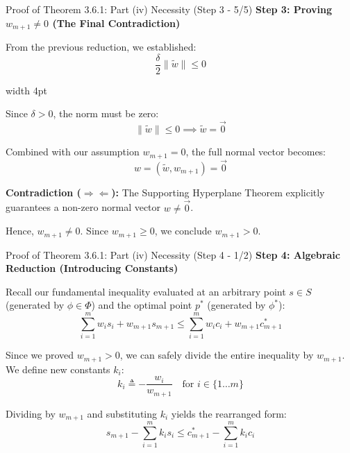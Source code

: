 \documentclass[10pt, aspectratio=169, xcolor=dvipsnames]{beamer}
\newcommand{\lead}[1]{{\color{UniBlue}\bfseries #1}}
\begin{document}
\begin{frame}{Proof of Theorem 3.6.1: Part (iv) Necessity (Step 3 - 5/5)}
    \lead{Step 3: Proving $w_{m+1} \neq 0$ (The Final Contradiction)}\\
    \vspace{0.3cm}
    
    From the previous reduction, we established:
    \[ \frac{\delta}{2} \|\tilde{w}\| \le 0 \]
    
    \vspace{0.3cm}
    \noindent
    {\color{Teal}\vrule width 4pt}%
    \hspace{10pt}%
    \begin{minipage}{\dimexpr\textwidth-14pt\relax}
        \color{Slate}
        Since $\delta > 0$, the norm must be zero:
        \[ \|\tilde{w}\| \le 0 \implies \tilde{w} = \vec{0} \]
        
        \vspace{0.1cm}
        Combined with our assumption $w_{m+1} = 0$, the full normal vector becomes:
        \[ w = (\tilde{w}, w_{m+1}) = \vec{0} \]
        
        \vspace{0.2cm}
        \textbf{Contradiction ($\Rightarrow\Leftarrow$):} The Supporting Hyperplane Theorem explicitly guarantees a non-zero normal vector $w \neq \vec{0}$.
        
        \vspace{0.3cm}
        Hence, $w_{m+1} \neq 0$. Since $w_{m+1} \ge 0$, we conclude \textbf{$w_{m+1} > 0$}.
    \end{minipage}
\end{frame}

\begin{frame}{Proof of Theorem 3.6.1: Part (iv) Necessity (Step 4 - 1/2)}
    \lead{Step 4: Algebraic Reduction (Introducing Constants)}\\
    \vspace{0.2cm}
    
    Recall our fundamental inequality evaluated at an arbitrary point $s \in S$ (generated by $\phi \in \Phi$) and the optimal point $p^*$ (generated by $\phi^*$):
    \[ \sum_{i=1}^m w_i s_i + w_{m+1} s_{m+1} \le \sum_{i=1}^m w_i c_i + w_{m+1} c^*_{m+1} \]
    
    \vspace{0.2cm}
    Since we proved $w_{m+1} > 0$, we can safely divide the entire inequality by $w_{m+1}$. We define new constants $k_i$:
    \[ k_i \triangleq -\frac{w_i}{w_{m+1}} \quad \text{for } i \in \{1 \dots m\} \]
    
    \vspace{0.2cm}
    Dividing by $w_{m+1}$ and substituting $k_i$ yields the rearranged form:
    \[ s_{m+1} - \sum_{i=1}^m k_i s_i \le c^*_{m+1} - \sum_{i=1}^m k_i c_i \]
\end{frame}
\end{document}
